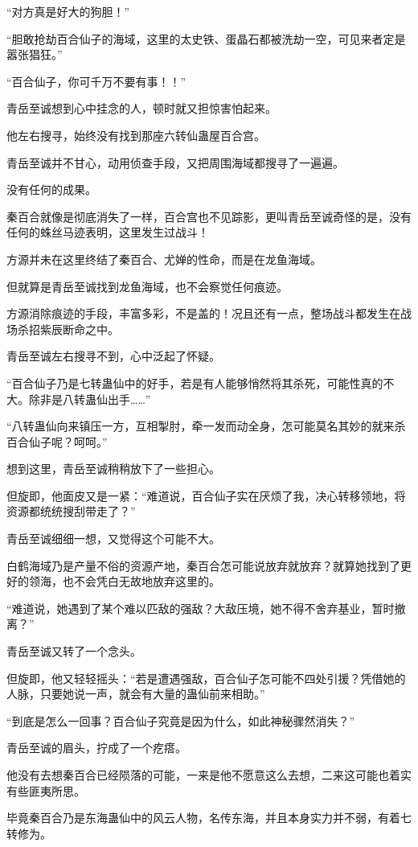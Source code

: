 \begin{this_body}
“对方真是好大的狗胆！”

“胆敢抢劫百合仙子的海域，这里的太史铁、蛋晶石都被洗劫一空，可见来者定是嚣张猖狂。”

“百合仙子，你可千万不要有事！！”

青岳至诚想到心中挂念的人，顿时就又担惊害怕起来。

他左右搜寻，始终没有找到那座六转仙蛊屋百合宫。

青岳至诚并不甘心，动用侦查手段，又把周围海域都搜寻了一遍遍。

没有任何的成果。

秦百合就像是彻底消失了一样，百合宫也不见踪影，更叫青岳至诚奇怪的是，没有任何的蛛丝马迹表明，这里发生过战斗！

方源并未在这里终结了秦百合、尤婵的性命，而是在龙鱼海域。

但就算是青岳至诚找到龙鱼海域，也不会察觉任何痕迹。

方源消除痕迹的手段，丰富多彩，不是盖的！况且还有一点，整场战斗都发生在战场杀招紫辰断命之中。

青岳至诚左右搜寻不到，心中泛起了怀疑。

“百合仙子乃是七转蛊仙中的好手，若是有人能够悄然将其杀死，可能性真的不大。除非是八转蛊仙出手……”

“八转蛊仙向来镇压一方，互相掣肘，牵一发而动全身，怎可能莫名其妙的就来杀百合仙子呢？呵呵。”

想到这里，青岳至诚稍稍放下了一些担心。

但旋即，他面皮又是一紧：“难道说，百合仙子实在厌烦了我，决心转移领地，将资源都统统搜刮带走了？”

青岳至诚细细一想，又觉得这个可能不大。

白鹤海域乃是产量不俗的资源产地，秦百合怎可能说放弃就放弃？就算她找到了更好的领海，也不会凭白无故地放弃这里的。

“难道说，她遇到了某个难以匹敌的强敌？大敌压境，她不得不舍弃基业，暂时撤离？”

青岳至诚又转了一个念头。

但旋即，他又轻轻摇头：“若是遭遇强敌，百合仙子怎可能不四处引援？凭借她的人脉，只要她说一声，就会有大量的蛊仙前来相助。”

“到底是怎么一回事？百合仙子究竟是因为什么，如此神秘骤然消失？”

青岳至诚的眉头，拧成了一个疙瘩。

他没有去想秦百合已经陨落的可能，一来是他不愿意这么去想，二来这可能也着实有些匪夷所思。

毕竟秦百合乃是东海蛊仙中的风云人物，名传东海，并且本身实力并不弱，有着七转修为。


\end{this_body}
